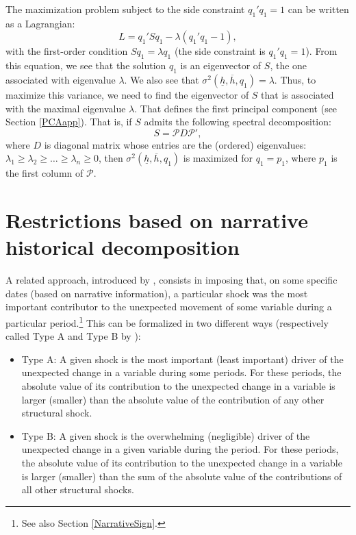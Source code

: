 \documentclass[
  12pt,
]{book}
\providecommand{\tightlist}{%
  \setlength{\itemsep}{0pt}\setlength{\parskip}{0pt}}
\theoremstyle{definition}
\theoremstyle{definition}
\theoremstyle{definition}
\theoremstyle{definition}
\theoremstyle{remark}
\begin{document}
The maximization problem subject to the side constraint \(q_1'q_1=1\) can be written as a Lagrangian: \[
L=q_1'Sq_1-\lambda(q_1'q_1-1),
\]
with the first-order condition \(Sq_1=\lambda q_1\) (the side constraint is \(q_1'q_1=1\)). From this equation, we see that the solution \(q_1\) is an eigenvector of \(S\), the one associated with eigenvalue \(\lambda\). We also see that \(\sigma^2(\underline{h},\overline{h},q_1)=\lambda\). Thus, to maximize this variance, we need to find the eigenvector of \(S\) that is associated with the maximal eigenvalue \(\lambda\). That defines the first principal component (see Section \ref{PCAapp}). That is, if \(S\) admits the following spectral decomposition:
\[
S = \mathcal{P}D\mathcal{P}',
\]
where \(D\) is diagonal matrix whose entries are the (ordered) eigenvalues: \(\lambda_1 \ge \lambda_2 \ge \dots \ge \lambda_n \ge 0\), then \(\sigma^2(\underline{h},\overline{h},q_1)\) is maximized for \(q_1 = p_1\), where \(p_1\) is the first column of \(\mathcal{P}\).

\hypertarget{NarrativeHistDecomp}{%
\section{Restrictions based on narrative historical decomposition}\label{NarrativeHistDecomp}}

A related approach, introduced by \citet{AntolinDiaz_RubioRamirez_2018}, consists in imposing that, on some specific dates (based on narrative information), a particular shock was the most important contributor to the unexpected movement of some variable during a particular period.\footnote{See also Section \ref{NarrativeSign}.} This can be formalized in two different ways (respectively called Type A and Type B by \citet{AntolinDiaz_RubioRamirez_2018}):

\begin{itemize}
\tightlist
\item
  Type A: A given shock is the most important (least important) driver of the unexpected change in a variable during some periods. For these periods, the absolute value of its contribution to the unexpected change in a variable is larger (smaller) than the absolute value of the contribution of any other structural shock.
\item
  Type B: A given shock is the overwhelming (negligible) driver of the unexpected change in a given variable during the period. For these periods, the absolute value of its contribution to the unexpected change in a variable is larger (smaller) than the sum of the absolute value of the contributions of all other structural shocks.
\end{itemize}
\end{document}
